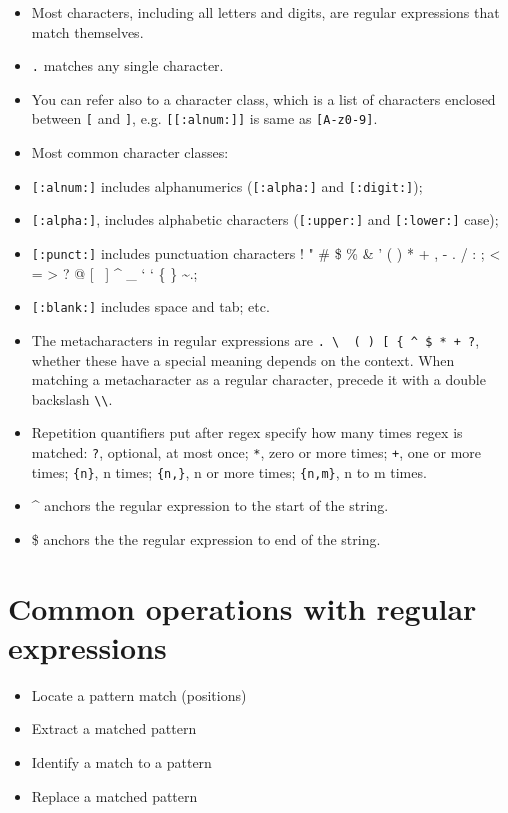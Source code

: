 \documentclass[]{book}
\providecommand{\tightlist}{%
  \setlength{\itemsep}{0pt}\setlength{\parskip}{0pt}}
\begin{document}
\begin{itemize}
\tightlist
\item
  Most characters, including all letters and digits, are regular
  expressions that match themselves.
\item
  \texttt{.} matches any single character.
\item
  You can refer also to a character class, which is a list of characters
  enclosed between \texttt{{[}} and \texttt{{]}}, e.g.
  \texttt{{[}{[}:alnum:{]}{]}} is same as \texttt{{[}A-z0-9{]}}.
\item
  Most common character classes:
\item
  \texttt{{[}:alnum:{]}} includes alphanumerics (\texttt{{[}:alpha:{]}}
  and \texttt{{[}:digit:{]}});
\item
  \texttt{{[}:alpha:{]}}, includes alphabetic characters
  (\texttt{{[}:upper:{]}} and \texttt{{[}:lower:{]}} case);
\item
  \texttt{{[}:punct:{]}} includes punctuation characters ! " \# \$ \% \&
  ' ( ) * + , - . / : ; \textless{} = \textgreater{} ? @ {[} ~{]} \^{}
  \_ ` ` \{ \textbar{} \} \textasciitilde{}.;
\item
  \texttt{{[}:blank:{]}} includes space and tab; etc.
\item
  The metacharacters in regular expressions are
  \texttt{.\ \textbackslash{}\ \textbar{}\ (\ )\ {[}\ \{\ \^{}\ \$\ *\ +\ ?},
  whether these have a special meaning depends on the context. When
  matching a metacharacter as a regular character, precede it with a
  double backslash \texttt{\textbackslash{}\textbackslash{}}.
\item
  Repetition quantifiers put after regex specify how many times regex is
  matched: \texttt{?}, optional, at most once; \texttt{*}, zero or more
  times; \texttt{+}, one or more times; \texttt{\{n\}}, n times;
  \texttt{\{n,\}}, n or more times; \texttt{\{n,m\}}, n to m times.
\item
  \^{} anchors the regular expression to the start of the string.
\item
  \$ anchors the the regular expression to end of the string.
\end{itemize}

\section{Common operations with regular
expressions}\label{common-operations-with-regular-expressions}

\begin{itemize}
\tightlist
\item
  Locate a pattern match (positions)
\item
  Extract a matched pattern
\item
  Identify a match to a pattern
\item
  Replace a matched pattern
\end{itemize}
\end{document}
